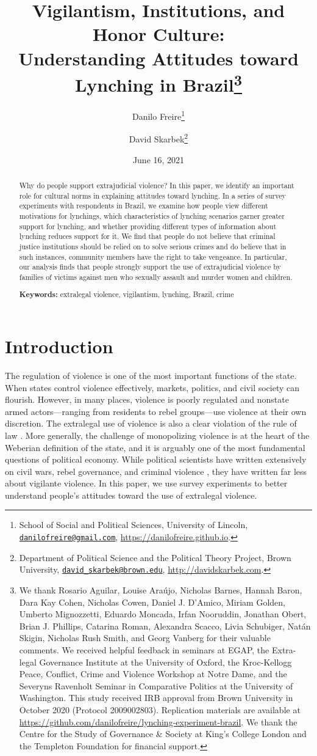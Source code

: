 \documentclass[12pt,ansiapaper]{article}
\title{Vigilantism, Institutions, and Honor Culture:\\ Understanding Attitudes toward Lynching in Brazil\footnote{We thank Rosario Aguilar, Louise Araújo, Nicholas Barnes, Hannah Baron, Dara Kay Cohen, Nicholas Cowen, Daniel J. D'Amico, Miriam Golden, Umberto Mignozzetti, Eduardo Moncada, Irfan Nooruddin, Jonathan Obert, Brian J. Phillips, Catarina Roman, Alexandra Scacco, Livia Schubiger, Natán Skigin, Nicholas Rush Smith, and Georg Vanberg for their valuable comments. We received helpful feedback in seminars at EGAP, the Extra-legal Governance Institute at the University of Oxford, the Kroc-Kellogg Peace, Conflict, Crime and Violence Workshop at Notre Dame, and the Severyns Ravenholt Seminar in Comparative Politics at the University of Washington. This study received IRB approval from Brown University in October 2020 (Protocol 2009002803). Replication materials are available at \url{https://github.com/danilofreire/lynching-experiment-brazil}. We thank the Centre for the Study of Governance \& Society at King's College London and the Templeton Foundation for financial support.}}
\author{Danilo Freire\footnote{School of Social and Political Sciences, University of Lincoln, \href{mailto:danilofreire@gmail.com}{\texttt{danilofreire@gmail.com}}, \url{https://danilofreire.github.io}.} \and David Skarbek\footnote{Department of Political Science and the Political Theory Project, Brown University, \href{mailto:david_skarbek@brown.edu}{\texttt{david\_skarbek@brown.edu}}, \url{http://davidskarbek.com}.}}
\date{June 16, 2021}
\begin{document}
\maketitle

\begin{abstract}
\doublespacing \noindent Why do people support extrajudicial violence? In this paper, we identify an important role for cultural norms in explaining attitudes toward lynching. In a series of survey experiments with respondents in Brazil, we examine how people view different motivations for lynchings, which characteristics of lynching scenarios garner greater support for lynching, and whether providing different types of information about lynching reduces support for it. We find  that people do not believe that criminal justice institutions should be relied on to solve serious crimes and do believe that in such instances, community members have the right to take vengeance. In particular, our analysis finds that people strongly support the use of extrajudicial violence by families of victims against men who sexually assault and murder women and children. 
\vspace{.25cm}

\noindent \textbf{Keywords:} extralegal violence, vigilantism, lynching, Brazil, crime 
\vspace{.25cm}

\end{abstract}

\newpage

\section{Introduction}
\label{sec:introduction}

\doublespacing

The regulation of violence is one of the most important functions of the state. When states control violence effectively, markets, politics, and civil society can flourish. However, in many places, violence is poorly regulated and nonstate armed actors---ranging from residents to rebel groups---use violence at their own discretion. The extralegal use of violence is also a clear violation of the rule of law \citep[48-49]{blair2020peacekeeping}. More generally, the challenge of monopolizing violence is at the heart of the Weberian definition of the state, and it is arguably one of the most fundamental questions of political economy. While political scientists have written extensively on civil wars, rebel governance, and criminal violence \citep{arjona2016rebelocracy, trejo2021high, barnes2017criminal}, they have written far less about vigilante violence. In this paper, we use survey experiments to better understand people's attitudes toward the use of extralegal violence. 
\end{document}
